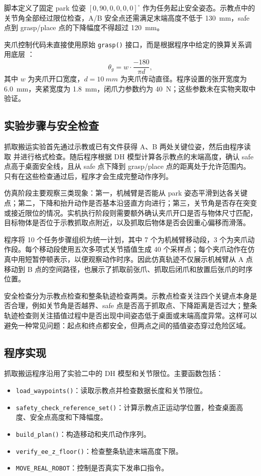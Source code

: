 脚本定义了固定 park 位姿 $[0,90,0,0,0,0]^\circ$ 作为任务起止安全姿态。示教点中的关节角全部经过限位检查，A/B 安全点还需满足末端高度不低于 \SI{130}{mm}，safe 点到 grasp/place 点的下降幅度不得超过 \SI{120}{mm}。

夹爪控制代码未直接使用原始 \texttt{grasp()} 接口，而是根据程序中给定的换算关系调用底层 ：
\[
\theta_g = w \cdot \frac{-180}{\pi d},
\]
其中 $w$ 为夹爪开口宽度，$d=\SI{10}{mm}$ 为夹爪传动直径。程序设置的张开宽度为 \SI{6.0}{mm}，夹紧宽度为 \SI{1.8}{mm}，闭爪力参数约为 \SI{40}{N}；这些参数未在实物夹取中验证。

\subsection{实验步骤与安全检查}

抓取搬运实验首先通过示教或已有文件获得 A、B 两处关键位姿，然后由程序读取  并进行格式检查。随后程序根据 DH 模型计算各示教点的末端高度，确认 safe 点高于桌面安全线，且从 safe 点下降到 grasp/place 点的距离处于允许范围内。只有在这些检查通过后，程序才会生成完整动作序列。

仿真阶段主要观察三类现象：第一，机械臂是否能从 park 姿态平滑到达各关键点；第二，下降和抬升动作是否基本沿竖直方向进行；第三，关节角是否存在突变或接近限位的情况。实机执行阶段则需要额外确认夹爪开口是否与物体尺寸匹配，目标物体是否位于示教抓取点附近，以及抓取后物体是否会因重心偏移而滑落。

程序将 10 个任务步骤组织为统一计划，其中 7 个为机械臂移动段，3 个为夹爪动作段。每个移动段使用五次多项式关节插值生成 40 个采样点；每个夹爪动作在仿真中用短暂停顿表示，以便观察动作时序。因此仿真轨迹不仅展示机械臂从 A 点移动到 B 点的空间路径，也展示了抓取前张爪、抓取后闭爪和放置后张爪的时序位置。

安全检查分为示教点检查和整条轨迹检查两类。示教点检查关注四个关键点本身是否合理，例如关节角是否越界、safe 点是否高于抓取点、下降距离是否过大；整条轨迹检查则关注插值过程中是否出现中间姿态低于桌面或末端高度异常。这样可以避免一种常见问题：起点和终点都安全，但两点之间的插值姿态穿过危险区域。

\subsection{程序实现}

抓取搬运程序沿用了实验二中的 DH 模型和关节限位。主要函数包括：

\begin{itemize}
  \item \texttt{load\_waypoints()}：读取示教点并检查数据长度和关节限位。
  \item \texttt{safety\_check\_reference\_set()}：计算示教点正运动学位置，检查桌面高度、安全点高度和下降幅度。
  \item \texttt{build\_plan()}：构造移动和夹爪动作序列。
  \item \texttt{verify\_ee\_z\_floor()}：检查整条轨迹末端高度下限。
  \item \texttt{MOVE\_REAL\_ROBOT}：控制是否真实下发串口指令。
\end{itemize}

